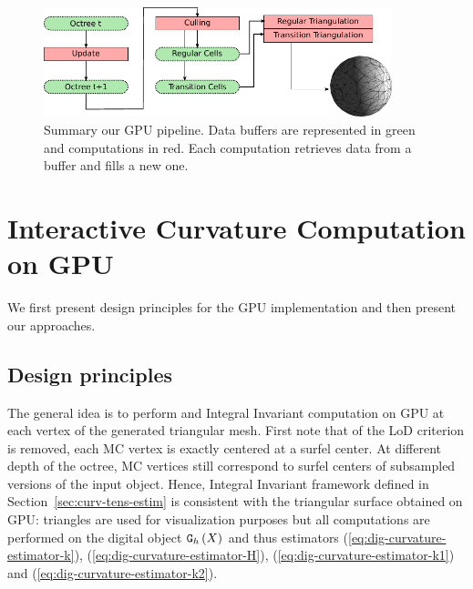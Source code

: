 \documentclass{llncs}
\begin{document}
\begin{figure}[!htbp]
  \centering
  \includegraphics[width=0.9\textwidth]{figs/pipeline}
  \caption{ Summary our GPU pipeline. Data buffers are
    represented in green and computations in red. Each computation
    retrieves data from a buffer and fills a new one. }
  \label{fig_pipeline}
\end{figure}




\section{Interactive Curvature Computation on GPU}
\label{sec:inter-visu-gpu}

We first present design principles for the GPU implementation and then
present our approaches.

\subsection{Design principles}

The general idea is to perform and Integral Invariant computation on
GPU at each vertex of the generated triangular mesh. First note that
of the LoD criterion is removed, each MC vertex is exactly centered at
a surfel center. At different depth of the octree, MC vertices still
correspond to surfel centers of subsampled versions of the input
object. Hence, Integral Invariant framework defined in
Section~\ref{sec:curv-tens-estim} is consistent with the triangular
surface obtained on GPU: triangles are used for visualization purposes
but all computations are performed on the digital object $\mathtt{G}_{h}\left(X\right)$ and thus
estimators
(\ref{eq:dig-curvature-estimator-k}),
(\ref{eq:dig-curvature-estimator-H}), (\ref{eq:dig-curvature-estimator-k1})
and (\ref{eq:dig-curvature-estimator-k2}).
\end{document}
